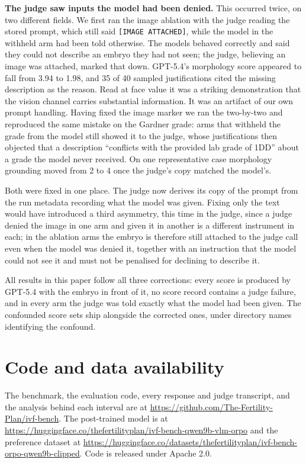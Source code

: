\documentclass[11pt]{article}
\begin{document}
\textbf{The judge saw inputs the model had been denied.} This occurred twice, on
two different fields. We first ran the image
ablation with the judge reading the stored prompt, which still said
\texttt{[IMAGE ATTACHED]}, while the model in the withheld arm had been told
otherwise. The models behaved correctly and said they could not describe an
embryo they had not seen; the judge, believing an image was attached, marked that
down. GPT-5.4's morphology score appeared to fall from 3.94 to 1.98, and 35 of 40
sampled justifications cited the missing description as the reason. Read at face
value it was a striking demonstration that the vision channel carries substantial
information. It was an artifact of our own prompt handling. Having fixed the
image marker we ran the two-by-two and reproduced the same mistake on the Gardner
grade: arms that withheld the grade from the model still showed it to the judge,
whose justifications then objected that a description ``conflicts with the
provided lab grade of 1DD'' about a grade the model never received. On one
representative case morphology grounding moved from 2 to 4 once the judge's copy
matched the model's.

Both were fixed in one place. The judge now derives its copy of the prompt from
the run metadata recording what the model was given. Fixing only the text would
have introduced a third asymmetry, this time in the judge, since a judge denied
the image in one arm and given it in another is a different instrument in each;
in the ablation arms the embryo is therefore still attached to the judge call
even when the model was denied it, together with an instruction that the model
could not see it and must not be penalised for declining to describe it.

All results in this paper follow all three corrections: every score is produced
by GPT-5.4 with the embryo in front of it, no score record contains a judge
failure, and in every arm the judge was told exactly what the model had been
given. The confounded score sets ship alongside the corrected ones, under
directory names identifying the confound.


\section{Code and data availability}
\label{app:artifacts}
The benchmark, the evaluation code, every response and judge transcript, and the analysis behind each interval are at \url{https://github.com/The-Fertility-Plan/ivf-bench}. The post-trained model is at \url{https://huggingface.co/thefertilityplan/ivf-bench-qwen9b-vlm-orpo} and the preference dataset at \url{https://huggingface.co/datasets/thefertilityplan/ivf-bench-orpo-qwen9b-clipped}. Code is released under Apache 2.0.
\end{document}
